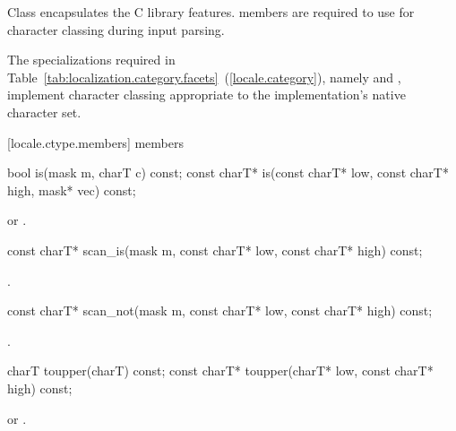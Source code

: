 \pnum
Class
encapsulates the C library
features.
members are required to use
for character classing during input parsing.

\pnum
The specializations required in Table~\ref{tab:localization.category.facets}~(\ref{locale.category}), namely
and
,
implement character classing appropriate
to the implementation's native character set.

[locale.ctype.members]{ members}

%
\begin{itemdecl}
bool         is(mask m, charT c) const;
const charT* is(const charT* low, const charT* high,
                mask* vec) const;
\end{itemdecl}

\begin{itemdescr}
\pnum
\returns
{}
or
.
\end{itemdescr}

%
\begin{itemdecl}
const charT* scan_is(mask m,
                     const charT* low, const charT* high) const;
\end{itemdecl}

\begin{itemdescr}
\pnum
\returns
{}.
\end{itemdescr}

%
\begin{itemdecl}
const charT* scan_not(mask m,
                      const charT* low, const charT* high) const;
\end{itemdecl}

\begin{itemdescr}
\pnum
\returns
{}.
\end{itemdescr}

%
\begin{itemdecl}
charT        toupper(charT) const;
const charT* toupper(charT* low, const charT* high) const;
\end{itemdecl}

\begin{itemdescr}
\pnum
\returns
{}
or
.
\end{itemdescr}

